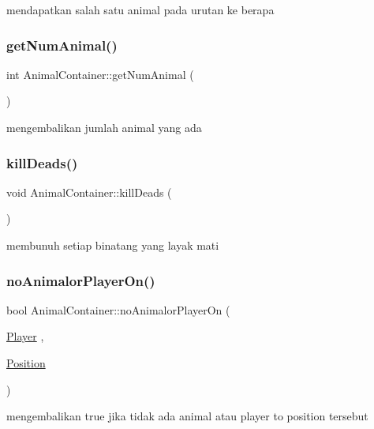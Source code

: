 mendapatkan salah satu animal pada urutan ke berapa \mbox{\label{class_animal_container_a833f30ae3d1f5d065204b2ad75e89e95}} 
\subsubsection{\texorpdfstring{getNumAnimal()}{getNumAnimal()}}
{\footnotesize\ttfamily int Animal\+Container\+::get\+Num\+Animal (\begin{DoxyParamCaption}{ }\end{DoxyParamCaption})}

mengembalikan jumlah animal yang ada \mbox{\label{class_animal_container_a9c877733c04093a8017ff7b088a9b79a}} 
\subsubsection{\texorpdfstring{killDeads()}{killDeads()}}
{\footnotesize\ttfamily void Animal\+Container\+::kill\+Deads (\begin{DoxyParamCaption}{ }\end{DoxyParamCaption})}

membunuh setiap binatang yang layak mati \mbox{\label{class_animal_container_abbda31303f225ff20f472f894444f1cc}} 
\subsubsection{\texorpdfstring{noAnimalorPlayerOn()}{noAnimalorPlayerOn()}}
{\footnotesize\ttfamily bool Animal\+Container\+::no\+Animalor\+Player\+On (\begin{DoxyParamCaption}\item[{\mbox{\hyperlink{class_player}{Player}}}]{,  }\item[{\mbox{\hyperlink{class_position}{Position}}}]{ }\end{DoxyParamCaption})}

mengembalikan true jika tidak ada animal atau player to position tersebut \mbox{\label{class_animal_container_a606e8fbe513b23a09e58b4e6484795de}} 
